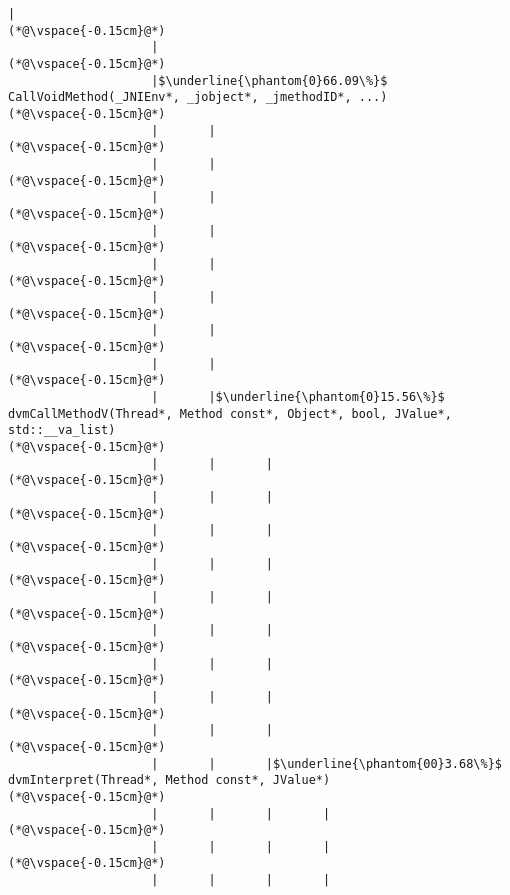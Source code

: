 \begin{lstlisting}[caption=Metodikutsu C$\to$Java 20 int-parametrilla, label=profile:C2JBenchmark00146, numberbychapter=true, frame=lines, float, floatplacement=t]
                    |
(*@\vspace{-0.15cm}@*)
                    |
(*@\vspace{-0.15cm}@*)
                    |$\underline{\phantom{0}66.09\%}$ CallVoidMethod(_JNIEnv*, _jobject*, _jmethodID*, ...)
(*@\vspace{-0.15cm}@*)
                    |       |
(*@\vspace{-0.15cm}@*)
                    |       |
(*@\vspace{-0.15cm}@*)
                    |       |
(*@\vspace{-0.15cm}@*)
                    |       |
(*@\vspace{-0.15cm}@*)
                    |       |
(*@\vspace{-0.15cm}@*)
                    |       |
(*@\vspace{-0.15cm}@*)
                    |       |
(*@\vspace{-0.15cm}@*)
                    |       |
(*@\vspace{-0.15cm}@*)
                    |       |$\underline{\phantom{0}15.56\%}$ dvmCallMethodV(Thread*, Method const*, Object*, bool, JValue*, std::__va_list)
(*@\vspace{-0.15cm}@*)
                    |       |       |
(*@\vspace{-0.15cm}@*)
                    |       |       |
(*@\vspace{-0.15cm}@*)
                    |       |       |
(*@\vspace{-0.15cm}@*)
                    |       |       |
(*@\vspace{-0.15cm}@*)
                    |       |       |
(*@\vspace{-0.15cm}@*)
                    |       |       |
(*@\vspace{-0.15cm}@*)
                    |       |       |
(*@\vspace{-0.15cm}@*)
                    |       |       |
(*@\vspace{-0.15cm}@*)
                    |       |       |
(*@\vspace{-0.15cm}@*)
                    |       |       |$\underline{\phantom{00}3.68\%}$ dvmInterpret(Thread*, Method const*, JValue*)
(*@\vspace{-0.15cm}@*)
                    |       |       |       |
(*@\vspace{-0.15cm}@*)
                    |       |       |       |
(*@\vspace{-0.15cm}@*)
                    |       |       |       |

\end{lstlisting}
